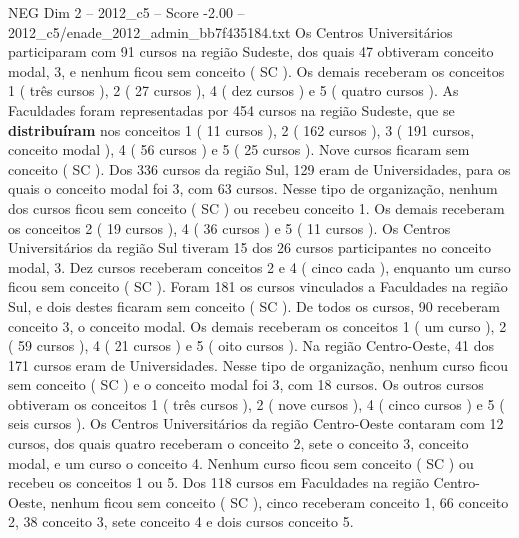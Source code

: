 \begin{textsample}{NEG Dim 2 – 2012\_c5 – Score -2.00 – 2012\_c5/enade\_2012\_admin\_bb7f435184.txt}
Os Centros Universitários participaram com 91 cursos na região Sudeste, dos quais 47 obtiveram conceito modal, 3, e nenhum ficou sem conceito ( SC ).
Os demais receberam os conceitos 1 ( três cursos ), 2 ( 27 cursos ), 4 ( dez cursos ) e 5 ( quatro cursos ).
As Faculdades foram representadas por 454 cursos na região Sudeste, que se \textbf{distribuíram} nos conceitos 1 ( 11 cursos ), 2 ( 162 cursos ), 3 ( 191 cursos, conceito modal ), 4 ( 56 cursos ) e 5 ( 25 cursos ).
Nove cursos ficaram sem conceito ( SC ).
Dos 336 cursos da região Sul, 129 eram de Universidades, para os quais o conceito modal foi 3, com 63 cursos.
Nesse tipo de organização, nenhum dos cursos ficou sem conceito ( SC ) ou recebeu conceito 1.
Os demais receberam os conceitos 2 ( 19 cursos ), 4 ( 36 cursos ) e 5 ( 11 cursos ).
Os Centros Universitários da região Sul tiveram 15 dos 26 cursos participantes no conceito modal, 3.
Dez cursos receberam conceitos 2 e 4 ( cinco cada ), enquanto um curso ficou sem conceito ( SC ).
Foram 181 os cursos vinculados a Faculdades na região Sul, e dois destes ficaram sem conceito ( SC ).
De todos os cursos, 90 receberam conceito 3, o conceito modal.
Os demais receberam os conceitos 1 ( um curso ), 2 ( 59 cursos ), 4 ( 21 cursos ) e 5 ( oito cursos ).
Na região Centro-Oeste, 41 dos 171 cursos eram de Universidades.
Nesse tipo de organização, nenhum curso ficou sem conceito ( SC ) e o conceito modal foi 3, com 18 cursos.
Os outros cursos obtiveram os conceitos 1 ( três cursos ), 2 ( nove cursos ), 4 ( cinco cursos ) e 5 ( seis cursos ).
Os Centros Universitários da região Centro-Oeste contaram com 12 cursos, dos quais quatro receberam o conceito 2, sete o conceito 3, conceito modal, e um curso o conceito 4.
Nenhum curso ficou sem conceito ( SC ) ou recebeu os conceitos 1 ou 5.
Dos 118 cursos em Faculdades na região Centro-Oeste, nenhum ficou sem conceito ( SC ), cinco receberam conceito 1, 66 conceito 2, 38 conceito 3, sete conceito 4 e dois cursos conceito 5.

\end{textsample}
